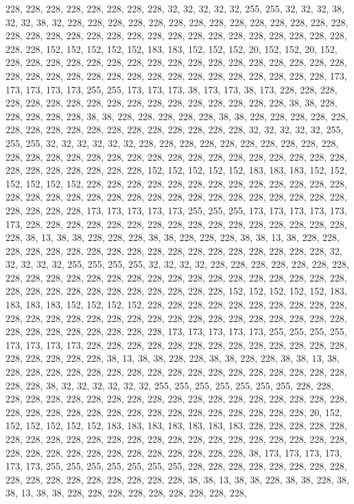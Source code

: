 {	228, 228, 228, 228, 228, 228, 228, 228, 32,  32,  32,  32,  32,  255, 255, 32,  32,  32,  38,  32,  32,  38,  32,  228, 228, 228, 228, 228, 228, 228, 228, 228, 228, 228, 228, 228, 228, 228, 228, 228, 228, 228, 228, 228, 228, 228, 228, 228, 228, 228, 228, 228, 228, 228, 228, 228, 152, 152, 152, 152, 152, 183, 183, 152, 152, 152, 20,  152, 152, 20,  152, 228, 228, 228, 228, 228, 228, 228, 228, 228, 228, 228, 228, 228, 228, 228, 228, 228, 228, 228, 228, 228, 228, 228, 228, 228, 228, 228, 228, 228, 228, 228, 228, 228, 173, 173, 173, 173, 173, 255, 255, 173, 173, 173, 38,  173, 173, 38,  173, 228, 228, 228, 228, 228, 228, 228, 228, 228, 228, 228, 228, 228, 228, 228, 228, 228, 38,  38,  228, 228, 228, 228, 228, 38,  38,  228, 228, 228, 228, 228, 38,  38,  228, 228, 228, 228, 228, 228, 228, 228, 
	228, 228, 228, 228, 228, 228, 228, 228, 228, 32,  32,  32,  32,  32,  255, 255, 255, 32,  32,  32,  32,  32,  32,  228, 228, 228, 228, 228, 228, 228, 228, 228, 228, 228, 228, 228, 228, 228, 228, 228, 228, 228, 228, 228, 228, 228, 228, 228, 228, 228, 228, 228, 228, 228, 228, 228, 228, 152, 152, 152, 152, 152, 183, 183, 183, 152, 152, 152, 152, 152, 152, 228, 228, 228, 228, 228, 228, 228, 228, 228, 228, 228, 228, 228, 228, 228, 228, 228, 228, 228, 228, 228, 228, 228, 228, 228, 228, 228, 228, 228, 228, 228, 228, 228, 228, 173, 173, 173, 173, 173, 255, 255, 255, 173, 173, 173, 173, 173, 173, 228, 228, 228, 228, 228, 228, 228, 228, 228, 228, 228, 228, 228, 228, 228, 228, 228, 38,  13,  38,  38,  228, 228, 228, 38,  38,  228, 228, 228, 38,  38,  13,  38,  228, 228, 228, 228, 228, 228, 228, 228, 
	228, 228, 228, 228, 228, 228, 228, 228, 228, 228, 32,  32,  32,  32,  32,  255, 255, 255, 255, 32,  32,  32,  32,  228, 228, 228, 228, 228, 228, 228, 228, 228, 228, 228, 228, 228, 228, 228, 228, 228, 228, 228, 228, 228, 228, 228, 228, 228, 228, 228, 228, 228, 228, 228, 228, 228, 228, 228, 152, 152, 152, 152, 152, 183, 183, 183, 183, 152, 152, 152, 152, 228, 228, 228, 228, 228, 228, 228, 228, 228, 228, 228, 228, 228, 228, 228, 228, 228, 228, 228, 228, 228, 228, 228, 228, 228, 228, 228, 228, 228, 228, 228, 228, 228, 228, 228, 173, 173, 173, 173, 173, 255, 255, 255, 255, 173, 173, 173, 173, 228, 228, 228, 228, 228, 228, 228, 228, 228, 228, 228, 228, 228, 228, 228, 228, 228, 228, 38,  13,  38,  38,  228, 228, 38,  38,  228, 228, 38,  38,  13,  38,  228, 228, 228, 228, 228, 228, 228, 228, 228, 
	228, 228, 228, 228, 228, 228, 228, 228, 228, 228, 38,  32,  32,  32,  32,  32,  32,  255, 255, 255, 255, 255, 255, 255, 228, 228, 228, 228, 228, 228, 228, 228, 228, 228, 228, 228, 228, 228, 228, 228, 228, 228, 228, 228, 228, 228, 228, 228, 228, 228, 228, 228, 228, 228, 228, 228, 228, 228, 20,  152, 152, 152, 152, 152, 152, 183, 183, 183, 183, 183, 183, 183, 228, 228, 228, 228, 228, 228, 228, 228, 228, 228, 228, 228, 228, 228, 228, 228, 228, 228, 228, 228, 228, 228, 228, 228, 228, 228, 228, 228, 228, 228, 228, 228, 228, 228, 38,  173, 173, 173, 173, 173, 173, 255, 255, 255, 255, 255, 255, 255, 228, 228, 228, 228, 228, 228, 228, 228, 228, 228, 228, 228, 228, 228, 228, 228, 228, 38,  38,  13,  38,  38,  228, 38,  38,  228, 38,  38,  13,  38,  38,  228, 228, 228, 228, 228, 228, 228, 228, 228, 
}
